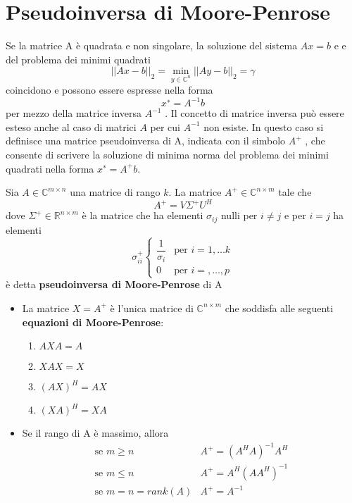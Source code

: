 \section{Pseudoinversa di Moore-Penrose}
Se la matrice A \`e quadrata e non singolare, la soluzione del
 sistema $Ax = b$ e e del problema dei minimi quadrati
$$|| Ax − b ||_{2} = \displaystyle \min_{y \in
\mathbb{C}^{n}} || Ay − b||_{2} = \gamma$$ coincidono 
e possono essere espresse nella forma
$$x^∗ = A^{−1} b$$
per mezzo della matrice inversa $A^{−1}$ . Il concetto di matrice
 inversa pu\`o essere esteso anche al caso di matrici $A$ per cui
 $A^{-1}$ non esiste. In questo caso si definisce una matrice
 pseudoinversa di A, indicata con il simbolo
$A^{+}$ , che consente di scrivere la soluzione di minima norma 
del problema dei minimi quadrati nella forma
$x^{∗} = A^+ b$.

\begin{defn}
  Sia $A \in \mathbb{C}^{m \times n}$ una matrice di rango $k$. La matrice
$A^{+} \in  \mathbb{C}^{n \times m}$ tale che
$$A^{+} = V \Sigma^{+} U^H$$
dove $\Sigma^+ \in \mathbb{R}^{n \times m}$ \`e  la matrice che ha 
elementi $\sigma_{ij}$ nulli per $i \neq j $ e per $i = j$
ha elementi
$$
\sigma_{ii}^{+}
\left\{
\begin{array}{lc}
\dfrac{1}{\sigma_i} & \text{per } i=1,\ldots k \\
0  & \text{per } i=,\ldots, p
\end{array}
\right.
$$
\`e detta \textbf{pseudoinversa di Moore-Penrose} di A
\end{defn}
\begin{property}
  \begin{itemize}
  \item 
 La matrice $X = A^+$ \`e  l'unica matrice di 
$\mathbb{C}^{n \times m}$ che soddisfa alle seguenti
\textbf{equazioni di Moore-Penrose}:
\begin{enumerate}
\item  $AXA = A$
\item $XAX = X$
\item $(AX)^H = AX$
\item $(XA)^H = XA$
\end{enumerate}


\item Se il rango di A \`e massimo, allora
$$
\begin{array}{ll}
 \text{se } m \geq n & A^{+} = (A^{H}A)^{-1}A^{H} \\ 
 \text{se } m \leq n &  A^{+} =  A^{H}(AA^{H})^{-1} \\ 
 \text{se } m =n = rank(A) & A^{+} =A^{-1}
\end{array}
$$
  \end{itemize}

\end{property}

